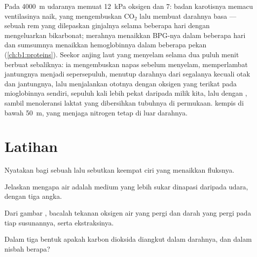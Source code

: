 \begin{example}\label{ex:b1:gas-exchange:altitudediving}
Pada \qty{4000}{m} udaranya memuat \qty{12}{kPa} oksigen dan
 \qty{7}{}: badan karotisnya memacu ventilasinya naik, yang
mengembuskan $\mathrm{CO_2}$ lalu membuat darahnya basa --- sebuah rem
yang dilepaskan ginjalnya selama beberapa hari dengan mengeluarkan
bikarbonat;  merahnya menaikkan BPG-nya dalam beberapa hari dan
sumsumnya menaikkan hemoglobinnya dalam beberapa pekan
(\cref{ch:b1:proteins}). Seekor anjing laut yang menyelam selama dua
puluh menit berbuat sebaliknya: ia mengembuskan napas sebelum
menyelam, memperlambat jantungnya menjadi sepersepuluh, menutup
darahnya dari segalanya kecuali otak dan jantungnya, lalu menjalankan
ototnya dengan oksigen yang terikat pada mioglobinnya sendiri, sepuluh
kali lebih pekat daripada milik kita, lalu dengan , sambil
menoleransi laktat yang dibersihkan tubuhnya di permukaan.
 kempis di bawah \qty{50}{m}, yang menjaga nitrogen tetap
di luar darahnya.
\end{example}

\section{Latihan}

\begin{exercise}[$\star$]\label{exo:b1:gas-exchange:1}
Nyatakan  bagi sebuah  lalu sebutkan
keempat ciri yang menaikkan fluksnya.
\end{exercise}

\begin{exercise}[$\star$]\label{exo:b1:gas-exchange:2}
Jelaskan mengapa air adalah medium yang lebih sukar dinapasi daripada
udara, dengan tiga angka.
\end{exercise}

\begin{exercise}[$\star$]\label{exo:b1:gas-exchange:3}
Dari gambar , bacalah tekanan oksigen air yang pergi dan
darah yang pergi pada tiap susunannya, serta ekstraksinya.
\end{exercise}

\begin{exercise}[$\star$]\label{exo:b1:gas-exchange:4}
Dalam tiga bentuk apakah karbon dioksida diangkut dalam darahnya, dan
dalam nisbah berapa?
\end{exercise}

